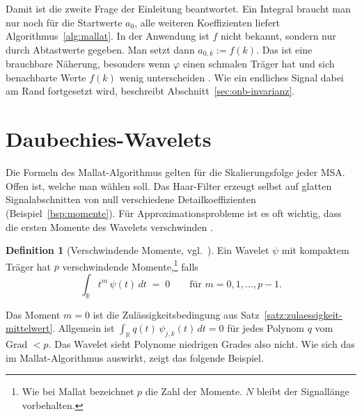 \documentclass[a4paper,11pt,bibliography=totoc,listof=totoc,headinclude=true,cleardoublepage=empty,oneside]{scrbook}
\theoremstyle{plain}
\theoremstyle{definition}
\newtheorem{Definition}[Satz]{Definition}
\newcommand{\R}{\mathbb{R}}
\begin{document}
Damit ist die zweite Frage der Einleitung beantwortet. Ein Integral braucht man
nur noch für die Startwerte $a_0$, alle weiteren Koeffizienten liefert
Algorithmus~\ref{alg:mallat}. In der Anwendung ist $f$ nicht bekannt, sondern
nur durch Abtastwerte gegeben. Man setzt dann $a_{0,k} := f(k)$. Das ist 
eine brauchbare Näherung, besonders wenn
$\varphi$ einen schmalen Träger hat und sich benachbarte Werte $f(k)$ wenig
unterscheiden \cite[Kap.~5.4]{blatter}. %
Wie ein endliches Signal dabei am Rand fortgesetzt wird, beschreibt
Abschnitt~\ref{sec:onb-invarianz}.

\section{Daubechies-Wavelets}
\label{sec:daubechies}

Die Formeln des Mallat-Algorithmus gelten für die Skalierungsfolge jeder MSA.
Offen ist, welche man wählen soll. Das Haar-Filter erzeugt selbst auf glatten
Signalabschnitten von null verschiedene Detailkoeffizienten
(Beispiel~\ref{bsp:momente}). Für Approximationsprobleme ist es oft wichtig,
dass die ersten Momente des Wavelets verschwinden \cite[Kap.~2.4.4]{lmr}. %

\begin{Definition}[Verschwindende Momente, vgl.\ {\cite[Kap.~3.5]{blatter}}] %
\label{def:momente}
Ein Wavelet $\psi$ mit kompaktem Träger hat $p$ verschwindende
Momente,\footnote{Wie bei Mallat bezeichnet $p$ die Zahl der Momente. $N$
  bleibt der Signallänge vorbehalten.} falls
\[
  \int_\R t^m\,\psi(t)\,dt \;=\; 0 \qquad\text{für } m = 0,1,\dots,p-1 .
\]
\end{Definition}

Das Moment $m=0$ ist die Zulässigkeitsbedingung aus
Satz~\ref{satz:zulaessigkeit-mittelwert}. Allgemein ist
$\int_\R q(t)\,\psi_{j,k}(t)\,dt = 0$ für jedes Polynom $q$ vom Grad $<p$. Das
Wavelet sieht Polynome niedrigen Grades also nicht. Wie sich das im
Mallat-Algorithmus auswirkt, zeigt das folgende Beispiel.
\end{document}
